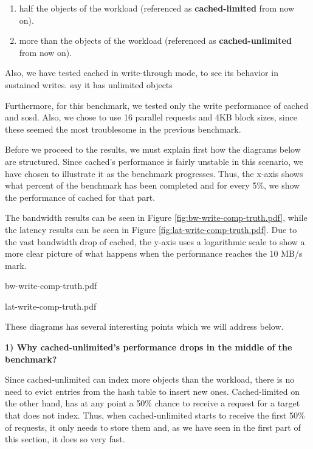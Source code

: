 \begin{enumerate}
	\item half the objects of the workload (referenced as 
		\textbf{cached-limited} from now on).
	\item more than the objects of the workload (referenced as 
		\textbf{cached-unlimited} from now on).
\end{enumerate}

Also, we have tested cached in write-through mode, to see its behavior in 
sustained writes. \fixme say it has unlimited objects 

Furthermore, for this benchmark, we tested only the write performance of cached 
and sosd.  Also, we chose to use 16 parallel requests and 4KB block sizes, 
since these seemed the most troublesome in the previous benchmark.

Before we proceed to the results, we must explain first how the diagrams below 
are structured. Since cached's performance is fairly unstable in this scenario, 
we have chosen to illustrate it as the benchmark progresses.  Thus, the x-axis 
shows what percent of the benchmark has been completed and for every 5\%, we 
show the performance of cached for that part.

The bandwidth results can be seen in Figure \ref{fig:bw-write-comp-truth.pdf}, 
while the latency results can be seen in Figure 
\ref{fig:lat-write-comp-truth.pdf}.  Due to the vast bandwidth drop of cached, 
the y-axis uses a logarithmic scale to show a more clear picture of what 
happens when the performance reaches the 10 MB/s mark.

{bw-write-comp-truth.pdf}

{lat-write-comp-truth.pdf}

These diagrams has several interesting points which we will address below.

\textbf{1) Why cached-unlimited's performance drops in the middle of the 
	benchmark?}

Since cached-unlimited can index more objects than the workload, there is no 
need to evict entries from the hash table to insert new ones. Cached-limited on 
the other hand, has at any point a 50\% chance to receive a request for a 
target that does not index. Thus, when cached-unlimited starts to receive the 
first 50\% of requests, it only needs to store them and, as we have seen in the 
first part of this section, it does so very fast.

